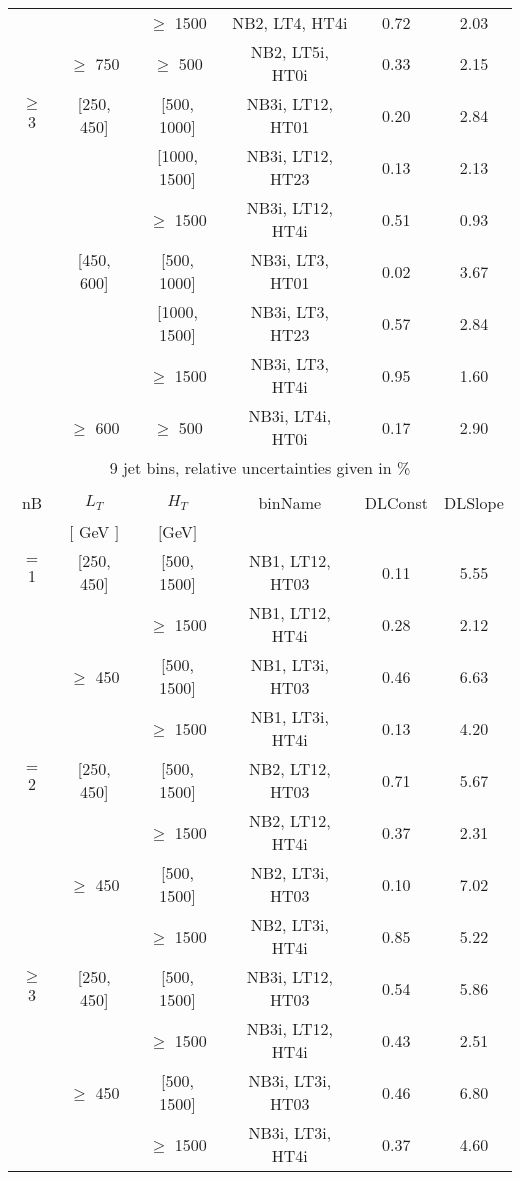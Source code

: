 \begin{table}[ht]
\begin{center}
\begin{tabular}{|c | c | c | c | c | c | }
\cline{3-6}  & & $\geq$ 1500 &NB2, LT4, HT4i & 0.72 & 2.03 \\ 
\cline{2-6}   & $\geq$ 750 & $\geq$ 500&NB2, LT5i, HT0i & 0.33 & 2.15 \\ 
\cline{1-6} $\geq$ 3 & [250, 450] & [500, 1000]&NB3i, LT12, HT01 & 0.20 & 2.84 \\ 
\cline{3-6}  & & [1000, 1500] &NB3i, LT12, HT23 & 0.13 & 2.13 \\ 
\cline{3-6}  & & $\geq$ 1500 &NB3i, LT12, HT4i & 0.51 & 0.93 \\ 
\cline{2-6}   & [450, 600] & [500, 1000]&NB3i, LT3, HT01 & 0.02 & 3.67 \\ 
\cline{3-6}  & & [1000, 1500] &NB3i, LT3, HT23 & 0.57 & 2.84 \\ 
\cline{3-6}  & & $\geq$ 1500 &NB3i, LT3, HT4i & 0.95 & 1.60 \\ 
\cline{2-6}   & $\geq$ 600 & $\geq$ 500&NB3i, LT4i, HT0i & 0.17 & 2.90 \\ 
 \hline 
\multicolumn{6}{|c|}{9 jet bins, relative uncertainties given in \%} \\ 
\multicolumn{6}{|c|}{} \\ \hline 
nB &  $L_T$ & $H_T$ & binName & DLConst & DLSlope  \\ 
   & $[$ GeV $]$  &  $[$GeV$]$  &  &  &   \\ \hline 
\cline{1-6} $=$ 1 & [250, 450] & [500, 1500]&NB1, LT12, HT03 & 0.11 & 5.55 \\ 
\cline{3-6}  & & $\geq$ 1500 &NB1, LT12, HT4i & 0.28 & 2.12 \\ 
\cline{2-6}   & $\geq$ 450 & [500, 1500]&NB1, LT3i, HT03 & 0.46 & 6.63 \\ 
\cline{3-6}  & & $\geq$ 1500 &NB1, LT3i, HT4i & 0.13 & 4.20 \\ 
\cline{1-6} $=$ 2 & [250, 450] & [500, 1500]&NB2, LT12, HT03 & 0.71 & 5.67 \\ 
\cline{3-6}  & & $\geq$ 1500 &NB2, LT12, HT4i & 0.37 & 2.31 \\ 
\cline{2-6}   & $\geq$ 450 & [500, 1500]&NB2, LT3i, HT03 & 0.10 & 7.02 \\ 
\cline{3-6}  & & $\geq$ 1500 &NB2, LT3i, HT4i & 0.85 & 5.22 \\ 
\cline{1-6} $\geq$ 3 & [250, 450] & [500, 1500]&NB3i, LT12, HT03 & 0.54 & 5.86 \\ 
\cline{3-6}  & & $\geq$ 1500 &NB3i, LT12, HT4i & 0.43 & 2.51 \\ 
\cline{2-6}   & $\geq$ 450 & [500, 1500]&NB3i, LT3i, HT03 & 0.46 & 6.80 \\ 
\cline{3-6}  & & $\geq$ 1500 &NB3i, LT3i, HT4i & 0.37 & 4.60 \\ 
 \hline 
\hline 
\end{tabular} 
\end{center} 
\end{table} 
